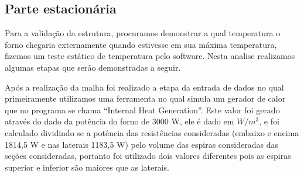 \subsection{Parte estacionária}
Para a validação da estrutura, procuramos demonstrar a qual temperatura o forno chegaria
externamente quando estivesse em sua máxima temperatura, fizemos um teste estático de
temperatura pelo software. Nesta analise realizamos algumas etapas que serão demonstradas a
seguir.

Após a realização da malha foi realizado a etapa da entrada de dados no qual primeiramente
utilizamos uma ferramenta no qual simula um gerador de calor que no programa se chama “Internal
Heat Generation”. Este valor foi gerado através do dado da potência do forno de 3000 W, ele é dado
em $W/m^{3}$, e foi calculado dividindo se a potência das resistências consideradas (embaixo e encima
1814,5 W e nas laterais 1183,5 W) pelo volume das espiras consideradas das seções consideradas,
portanto foi utilizado dois valores diferentes pois as espiras superior e inferior são maiores que as
laterais.

